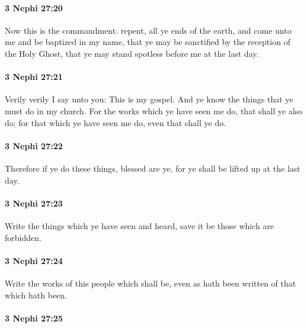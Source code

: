 		\paragraph{3 Nephi 27:20} %
			\label{3NEPHI-27-20}

			Now this is the commandment:
			repent, all ye ends of the earth,
			and come unto me and be baptized in my name,
			that ye may be sanctified by the reception of the Holy Ghost,
			that ye may stand spotless before me at the last day.

		\paragraph{3 Nephi 27:21} %
			\label{3NEPHI-27-21}

			Verily verily I say unto you: This is my gospel.
			And ye know the things that ye must do in my church.
			For the works which ye have seen me do, that shall ye also do;
			for that which ye have seen me do, even that shall ye do.

		\paragraph{3 Nephi 27:22} %
			\label{3NEPHI-27-22}

			Therefore if ye do these things, blessed are ye,
			for ye shall be lifted up at the last day.

		\paragraph{3 Nephi 27:23} %
			\label{3NEPHI-27-23}

			Write the things which ye have seen and heard,
			save it be those which are forbidden.

		\paragraph{3 Nephi 27:24} %
			\label{3NEPHI-27-24}

			Write the works of this people which shall be,
			even as hath been written of that which hath been.

		\paragraph{3 Nephi 27:25} %
			\label{3NEPHI-27-25}

